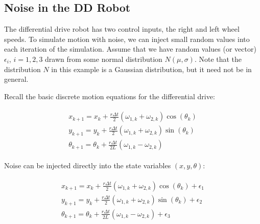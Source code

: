\hypertarget{lst:randomnumberswithparameters}{%
\label{lst:randomnumberswithparameters}}%
\begin{Shaded}
\begin{Highlighting}[]
\OperatorTok{,}

\OperatorTok{=}\NormalTok{ [} \OperatorTok{;} \NormalTok{]}
\OperatorTok{=}\NormalTok{ [} \OperatorTok{;}  \NormalTok{]}
\OperatorTok{=}\OperatorTok{,}
\OperatorTok{=}\OperatorTok{,}\NormalTok{)}
\end{Highlighting}
\end{Shaded}

\hypertarget{noise-in-the-dd-robot}{%
\subsection{Noise in the DD Robot}\label{noise-in-the-dd-robot}}

The differential drive robot has two control inputs, the right and left
wheel speeds. To simulate motion with noise, we can inject small random
values into each iteration of the simulation. Assume that we have random
values (or vector) \(\epsilon_i\), \(i=1,2,3\) drawn from some normal
distribution \(N(\mu,\sigma)\). Note that the distribution \(N\) in this
example is a Gaussian distribution, but it need not be in general.

Recall the basic discrete motion equations for the differential drive:

\[\begin{aligned}
\begin{array}{l}
 x_{k+1} = x_k + \frac{r\Delta t}{2} (\omega_{1, k}+\omega_{2, k})\cos(\theta_k) \\[2mm]
y_{k+1} = y_k + \frac{r\Delta t}{2} (\omega_{1, k}+\omega_{2, k})\sin(\theta_k) \\[2mm]
\theta_{k+1} = \theta_k + \frac{r\Delta t}{2L} (\omega_{1, k}-\omega_{2, k})
\end{array}
\end{aligned}\]

Noise can be injected directly into the state variables
\((x,y,\theta)\):

\[\begin{aligned}
\begin{array}{l}
 x_{k+1} = x_k + \frac{r\Delta t}{2} (\omega_{1, k}+\omega_{2, k})\cos(\theta_k) + \epsilon_1\\[2mm]
y_{k+1} = y_k + \frac{r\Delta t}{2} (\omega_{1, k}+\omega_{2, k})\sin(\theta_k) + \epsilon_2\\[2mm]
\theta_{k+1} = \theta_k + \frac{r\Delta t}{2L} (\omega_{1, k}-\omega_{2, k}) + \epsilon_3
\end{array}
\end{aligned}\]

